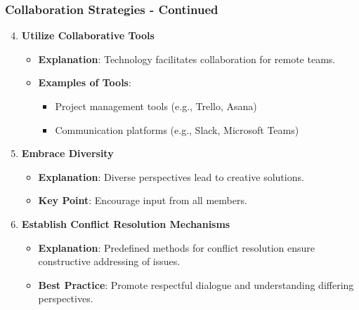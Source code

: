 \documentclass[aspectratio=169]{beamer}
\begin{document}
\begin{frame}[fragile]
    \frametitle{Collaboration Strategies - Continued}
    \begin{enumerate}
        \setcounter{enumi}{3}
        \item \textbf{Utilize Collaborative Tools} 
        \begin{itemize}
            \item \textbf{Explanation}: Technology facilitates collaboration for remote teams.
            \item \textbf{Examples of Tools}:
            \begin{itemize}
                \item Project management tools (e.g., Trello, Asana)
                \item Communication platforms (e.g., Slack, Microsoft Teams)
            \end{itemize}
        \end{itemize}

        \item \textbf{Embrace Diversity} 
        \begin{itemize}
            \item \textbf{Explanation}: Diverse perspectives lead to creative solutions.
            \item \textbf{Key Point}: Encourage input from all members.
        \end{itemize}

        \item \textbf{Establish Conflict Resolution Mechanisms} 
        \begin{itemize}
            \item \textbf{Explanation}: Predefined methods for conflict resolution ensure constructive addressing of issues.
            \item \textbf{Best Practice}: Promote respectful dialogue and understanding differing perspectives.
        \end{itemize}
    \end{enumerate}
\end{frame}
\end{document}
